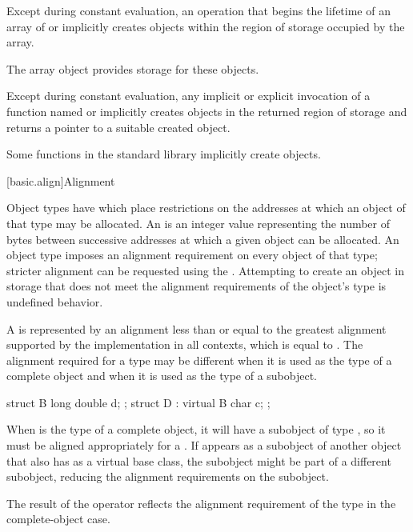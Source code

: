 \pnum
Except during constant evaluation,
an operation that begins the lifetime of
an array of  or 
implicitly creates objects within the region of storage occupied by the array.
\begin{note}
The array object provides storage for these objects.
\end{note}
Except during constant evaluation,
any implicit or explicit invocation of a function
named  or 
implicitly creates objects in the returned region of storage and
returns a pointer to a suitable created object.
\begin{note}
Some functions in the \Cpp{} standard library implicitly create
objects.
\end{note}

[basic.align]{Alignment}

\pnum
Object types have 
which place restrictions on the addresses at which an object of that type
may be allocated. An  is an 
integer value representing the number of bytes between successive addresses
at which a given object can be allocated. An object type imposes an alignment
requirement on every object of that type; stricter alignment can be requested
using the .
Attempting to create an object in storage that
does not meet the alignment requirements of the object's type
is undefined behavior.

\pnum
A  is represented by an alignment
less than or equal to the greatest alignment supported by the implementation in
all contexts, which is equal to
.
The alignment required for a type may be different when it is used as the type
of a complete object and when it is used as the type of a subobject.
\begin{example}
\begin{codeblock}
struct B { long double d; };
struct D : virtual B { char c; };
\end{codeblock}

When  is the type of a complete object, it will have a subobject of
type , so it must be aligned appropriately for a .
If  appears as a subobject of another object that also has 
as a virtual base class, the  subobject might be part of a different
subobject, reducing the alignment requirements on the  subobject.
\end{example}
The result of the  operator reflects the alignment
requirement of the type in the complete-object case.

